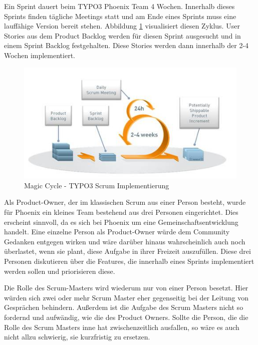 Ein Sprint dauert beim TYPO3 Phoenix Team 4 Wochen. Innerhalb dieses Sprints finden tägliche Meetings statt und am Ende eines Sprints muss eine lauffähige Version bereit stehen. Abbildung \ref{magic-cycle} visualisiert diesen Zyklus. User Stories aus dem Product Backlog werden für diesen Sprint ausgesucht und in einem Sprint Backlog festgehalten. Diese Stories werden dann innerhalb der 2-4 Wochen implementiert.
\begin{figure}[h]
	\centering
	\includegraphics[width=1\textwidth]{images/typo3-magic-cycle.jpg}
	\caption{Magic Cycle - TYPO3 Scrum Implementierung\cite{bib:agiler-phoenix}}
	\label{magic-cycle}
\end{figure}

Als Product-Owner, der im klassischen Scrum aus einer Person besteht, wurde für Phoenix  ein kleines Team bestehend aus drei Personen eingerichtet. Dies erscheint sinnvoll, da es sich bei Phoenix um eine Gemeinschaftsentwicklung handelt. Eine einzelne Person als Product-Owner würde dem Community Gedanken entgegen wirken und  wäre darüber hinaus wahrscheinlich auch noch überlastet, wenn sie plant, diese Aufgabe in ihrer Freizeit auszufüllen. Diese drei Personen diskutieren über die Features, die innerhalb eines Sprints implementiert werden sollen und priorisieren diese\cite{bib:forge}.

Die Rolle des Scrum-Masters wird wiederum nur von einer Person besetzt. Hier würden sich zwei oder mehr Scrum Master eher gegenseitig bei der Leitung von Gesprächen behindern. Außerdem ist die Aufgabe des Scrum Masters nicht so fordernd und aufwändig, wie die des Product Owners. Sollte die Person, die die Rolle des Scrum Masters inne hat zwischenzeitlich ausfallen, so wäre es auch nicht allzu schwierig, sie kurzfristig zu ersetzen\cite{bib:forge}.

